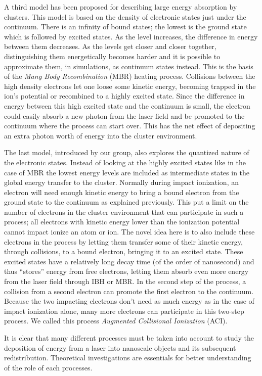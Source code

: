 A third model has been proposed for describing large energy absorption by
clusters. This model is based on the density of electronic states just under
the continuum. There is an infinity of bound states; the lowest is the ground
state which is followed by excited states. As the level increases, the
difference in energy between them decreases. As the levels get closer and
closer together, distinguishing them energetically becomes harder and it is
possible to approximate them, in simulations, as continuum states instead. This
is the basis of the \textit{Many Body Recombination} (MBR) heating
process\cite{Jungreuthmayer2005}. Collisions between the high density electrons
let one loose some kinetic energy, becoming trapped in the ion's potential or
recombined to a highly excited state. Since the difference in energy between
this high excited state and the continuum is small, the electron could easily
absorb a new photon from the laser field and be promoted to the continuum where
the process can start over. This has the net effect of depositing an extra
photon worth of energy into the cluster environment.

The last model, introduced by our group, also explores the quantized nature of
the electronic states. Instead of looking at the highly excited states like
in the case of MBR the lowest energy levels are included as intermediate states
in the global energy transfer to the cluster. Normally during impact
ionization, an electron will need enough kinetic energy to bring a bound
electron from the ground state to the continuum as explained previously. This
put a limit on the number of electrons in the cluster environment that can
participate in such a process; all electrons with kinetic energy lower than the
ionization potential cannot impact ionize an atom or ion. The novel idea here
is to also include these electrons in the process by letting them transfer some
of their kinetic energy, through collisions, to a bound electron, bringing it
to an excited state. These excited states have a relatively long decay time (of
the order of nanosecond\citeneeded) and thus ``stores'' energy from free
electrons, letting them absorb even more energy from the laser field through
IBH or MBR. In the second step of the process, a collision from a second
electron can promote the first electron to the continuum. Because the
two impacting electrons don't need as much energy as in the case of impact
ionization alone, many more electrons can participate in this two-step
process. We called this process \textit{Augmented Collisional Ionization} (ACI).

It is clear that many different processes must be taken into account to study
the deposition of energy from a laser into nanoscale objects and its subsequent
redistribution. Theoretical investigations are essentials for better
understanding of the role of each processes.


